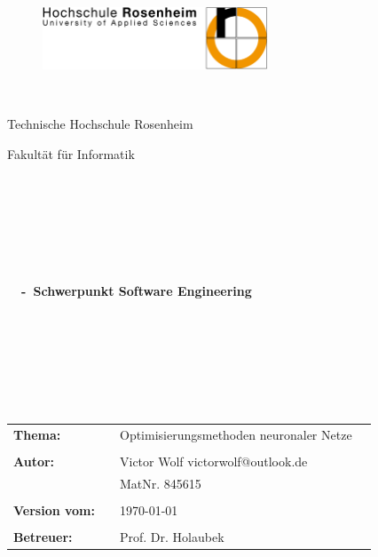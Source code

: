 \thispagestyle{empty}


\begin{figure}
 \begin{flushright}
 \includegraphics[width=0.6\textwidth]{abb/FHRO_Logo.PNG}
 \end{flushright}
\end{figure}


\begin{verbatim}


\end{verbatim}

\begin{center}
\Large{Technische Hochschule Rosenheim}
\end{center}


\begin{center}
\Large{Fakultät für Informatik}
\end{center}
\begin{verbatim}




\end{verbatim}
\begin{center}
\doublespacing
\textbf{\LARGE{\titleDocument}}\\
\singlespacing
\begin{verbatim}

\end{verbatim}
\textbf{{~\subjectDocument~-~Schwerpunkt Software Engineering}}
\end{center}
\begin{verbatim}

\end{verbatim}
\begin{center}

\end{center}

\begin{verbatim}






\end{verbatim}
\begin{flushleft}
\begin{tabular}{llll}
\textbf{Thema:} & & Optimisierungsmethoden neuronaler Netze & \\
& & \\
\textbf{Autor:} & & Victor Wolf victorwolf@outlook.de& \\
& & MatNr. 845615 & \\
& & \\
\textbf{Version vom:} & & \today &\\
& & \\
\textbf{Betreuer:} & & Prof. Dr. Holaubek &\\
\end{tabular}
\end{flushleft}
